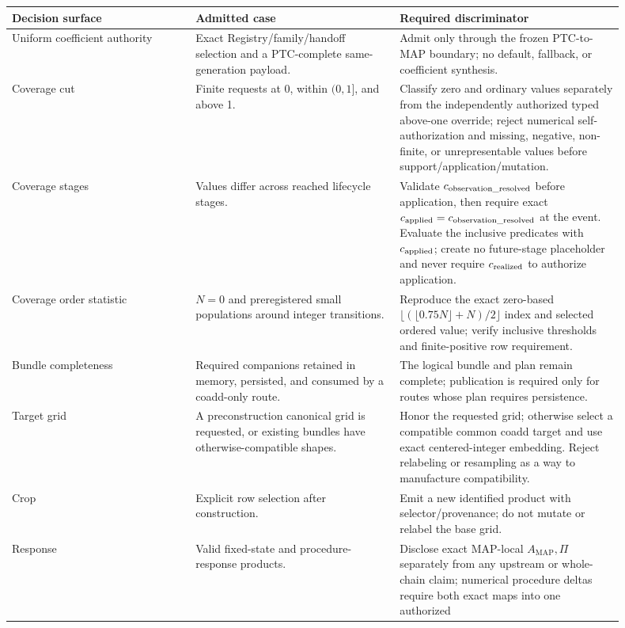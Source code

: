 \documentclass[10pt]{article}
\begin{document}
\begin{longtable}{L{0.27\linewidth}L{0.30\linewidth}L{0.33\linewidth}}
\toprule
Decision surface & Admitted case & Required discriminator\\
\midrule
Uniform coefficient authority & Exact Registry/family/handoff selection and a
PTC-complete same-generation payload. & Admit only through the frozen
PTC-to-MAP boundary; no default, fallback, or coefficient synthesis.\\
Coverage cut & Finite requests at 0, within \((0,1]\), and above 1. & Classify
zero and ordinary values separately from the independently authorized typed
above-one override; reject numerical self-authorization and missing, negative,
non-finite, or unrepresentable values before support/application/mutation.\\
Coverage stages & Values differ across reached lifecycle stages. & Validate
\(c_{\rm observation\_resolved}\) before application, then require exact
\(c_{\rm applied}=c_{\rm observation\_resolved}\) at the event. Evaluate the
inclusive predicates with \(c_{\rm applied}\); create no future-stage
placeholder and never require \(c_{\rm realized}\) to authorize application.\\
Coverage order statistic & \(N=0\) and preregistered small populations around
integer transitions. & Reproduce the exact zero-based
\(\lfloor(\lfloor0.75N\rfloor+N)/2\rfloor\) index and selected ordered value;
verify inclusive thresholds and finite-positive row requirement.\\
Bundle completeness & Required companions retained in memory, persisted, and
consumed by a coadd-only route. & The logical bundle and plan remain complete;
publication is required only for routes whose plan requires persistence.\\
Target grid & A preconstruction canonical grid is requested, or existing
bundles have otherwise-compatible shapes. & Honor the requested grid; otherwise
select a compatible common coadd target and use exact centered-integer
embedding.  Reject relabeling or resampling as a way to manufacture
compatibility.\\
Crop & Explicit row selection after construction. & Emit a new identified
product with selector/provenance; do not mutate or relabel the base grid.\\
Response & Valid fixed-state and procedure-response products. & Disclose exact
MAP-local \(A_{\mathrm{MAP}},\Pi\) separately from any upstream or whole-chain
claim; numerical procedure deltas require both exact maps into one authorized

\end{longtable}
\end{document}
